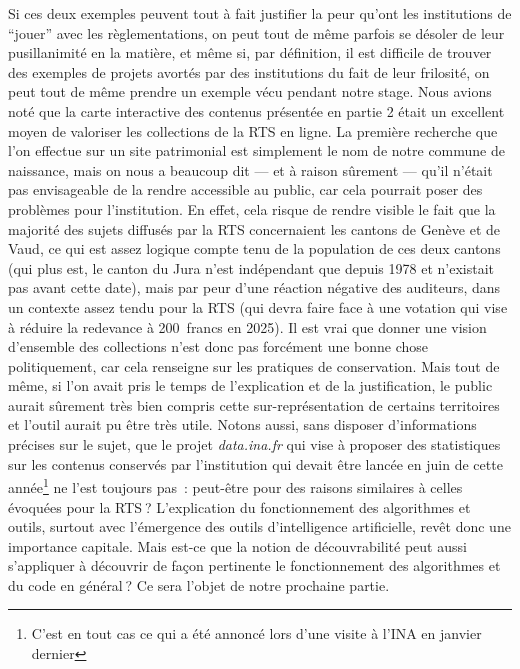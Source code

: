 Si ces deux exemples peuvent tout à fait justifier la peur qu’ont les institutions de \enquote{jouer} avec les règlementations, on peut tout de même parfois se désoler de leur pusillanimité en la matière, et même si, par définition, il est difficile de trouver des exemples de projets avortés par des institutions du fait de leur frilosité, on peut tout de même prendre un exemple vécu pendant notre stage. Nous avions noté que la carte interactive des contenus présentée en partie 2 était un excellent moyen de valoriser les collections de la RTS en ligne. La première recherche que l’on effectue sur un site patrimonial est simplement le nom de notre commune de naissance, mais on nous a beaucoup dit — et à raison sûrement — qu’il n’était pas envisageable de la rendre accessible au public, car cela pourrait poser des problèmes pour l’institution. En effet, cela risque de rendre visible le fait que la majorité des sujets diffusés par la RTS concernaient les cantons de Genève et de Vaud, ce qui est assez logique compte tenu de la population de ces deux cantons (qui plus est, le canton du Jura n’est indépendant que depuis 1978 et n’existait pas avant cette date), mais par peur d’une réaction négative des auditeurs, dans un contexte assez tendu pour la RTS (qui devra faire face à une votation qui vise à réduire la redevance à 200 francs en 2025). Il est vrai que donner une vision d’ensemble des collections n’est donc pas forcément une bonne chose politiquement, car cela renseigne sur les pratiques de conservation. Mais tout de même, si l’on avait pris le temps de l’explication et de la justification, le public aurait sûrement très bien compris cette sur-représentation de certains territoires et l’outil aurait pu être très utile. Notons aussi, sans disposer d’informations précises sur le sujet, que le projet \textit{data.ina.fr} qui vise à proposer des statistiques sur les contenus conservés par l’institution qui devait être lancée en juin de cette année\footnote{C'est en tout cas ce qui a été annoncé lors d'une visite à l'INA en janvier dernier} ne l’est toujours pas : peut-être pour des raisons similaires à celles évoquées pour la RTS ? L’explication du fonctionnement des algorithmes et outils, surtout avec l’émergence des outils d’intelligence artificielle, revêt donc une importance capitale. Mais est-ce que la notion de découvrabilité peut aussi s’appliquer à découvrir de façon pertinente le fonctionnement des algorithmes et du code en général ? Ce sera l’objet de notre prochaine partie.


